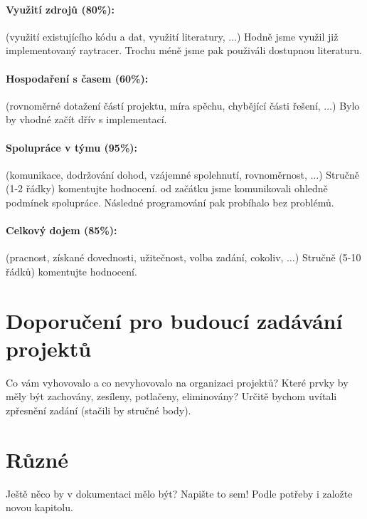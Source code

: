 \documentclass[12pt,a4paper,titlepage,final]{report}
\begin{document}
\paragraph{Využití zdrojů (80\%):} (využití existujícího kódu a dat, využití
literatury, $\ldots$)
Hodně jsme využil již implementovaný raytracer. Trochu méně jsme pak použiváli dostupnou literaturu.

\paragraph{Hospodaření s časem (60\%):} (rovnoměrné dotažení částí projektu,
míra spěchu, chybějící části řešení, $\ldots$)
Bylo by vhodné začít dřív s implementací.

\paragraph{Spolupráce v týmu (95\%):} (komunikace, dodržování dohod, vzájemné
spolehnutí, rovnoměrnost, $\ldots$)
Stručně (1-2 řádky) komentujte hodnocení. 
od začátku jsme komunikovali ohledně podmínek spolupráce. Následné programování pak probíhalo bez problémů.

\paragraph{Celkový dojem (85\%):} (pracnost, získané dovednosti, užitečnost,
volba zadání, cokoliv, $\ldots$)
Stručně (5-10 řádků) komentujte hodnocení. 

\section{Doporučení pro budoucí zadávání projektů}

Co vám vyhovovalo a co nevyhovovalo na organizaci projektů? Které prvky by měly
být zachovány, zesíleny, potlačeny, eliminovány?
Určitě bychom uvítali zpřesnění zadání (stačili by stručné body).

\section{Různé}

Ještě něco by v dokumentaci mělo být? Napište to sem! Podle potřeby i založte
novou kapitolu.
\end{document}
